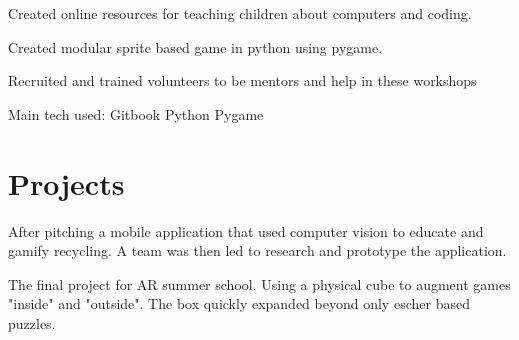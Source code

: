 \documentclass[a4paper]{deedy-resume} %
\begin{document}
\begin{minipage}[t]{0.66\textwidth}
\sectionspace %



\begin{tightitemize}
\item Created online resources for teaching children about computers and coding.
\item Created modular sprite based game in python using pygame. %
\item Recruited and trained volunteers to be mentors and help in these workshops \\
\end{tightitemize}
Main tech used: \textbullet{} Gitbook \textbullet{} Python \textbullet{} Pygame

\sectionspace %


\section{Projects}


After pitching a mobile application that used computer vision to educate and gamify recycling. %
A team was then led to research and prototype the application. %

\sectionspace %



The final project for AR summer school. Using a physical cube to augment games "inside" and "outside". The box quickly expanded beyond only escher based puzzles.%
\sectionspace %


\end{minipage}
\end{document}
